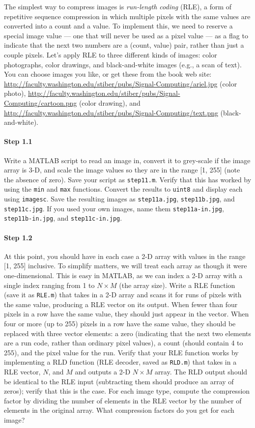 The simplest way to compress images is \emph{run-length coding} (RLE),
a form of repetitive sequence compression in which multiple pixels
with the same values are converted into a count and a value. To
implement this, we need to reserve a special image value --- one that
will never be used as a pixel value --- as a flag to indicate that the
next two numbers are a (count, value) pair, rather than just a couple
pixels. Let's apply RLE to three different kinds of images: color
photographs, color drawings, and black-and-white images (e.g., a scan
of text). You can choose images you like, or get these from the book
web site:
\url{http://faculty.washington.edu/stiber/pubs/Signal-Computing/ariel.jpg}
(color photo),
\url{http://faculty.washington.edu/stiber/pubs/Signal-Computing/cartoon.png}
(color drawing), and
\url{http://faculty.washington.edu/stiber/pubs/Signal-Computing/text.png}
(black-and-white).

\paragraph{Step 1.1} Write a MATLAB script to read an image in,
convert it to grey-scale if the image array is 3-D, and scale the
image values so they are in the range [1, 255] (note the absence of
zero). Save your script as \texttt{step11.m}.  Verify that this has
worked by using the \texttt{min} and \texttt{max} functions. Convert
the results to \texttt{uint8} and display each using
\texttt{imagesc}. Save the resulting images as \texttt{step11a.jpg},
\texttt{step11b.jpg}, and \texttt{step11c.jpg}. If you used your own
images, name them \texttt{step11a-in.jpg}, \texttt{step11b-in.jpg},
and \texttt{step11c-in.jpg}.

\paragraph{Step 1.2} At this point, you should have in each case a 2-D
array with values in the range [1, 255] inclusive. To simplify
matters, we will treat each array as though it were
one-dimensional. This is easy in MATLAB, as we can index a 2-D array
with a single index ranging from 1 to $N \times M$ (the array
size). Write a RLE function (save it as \texttt{RLE.m}) that takes in
a 2-D array and scans it for runs of pixels with the same value,
producing a RLE vector on its output. When fewer than four pixels in a
row have the same value, they should just appear in the vector. When
four or more (up to 255) pixels in a row have the same value, they
should be replaced with three vector elements: a zero (indicating that
the next two elements are a run code, rather than ordinary pixel
values), a count (should contain 4 to 255), and the pixel value for
the run. Verify that your RLE function works by implementing a RLD
function (RLE decoder, saved as \texttt{RLD.m}) that takes in a RLE
vector, $N$, and $M$ and outputs a 2-D $N \times M$ array. The RLD
output should be identical to the RLE input (subtracting them should
produce an array of zeros); verify that this is the case. For each
image type, compute the compression factor by dividing the number of
elements in the RLE vector by the number of elements in the original
array. What compression factors do you get for each image?

